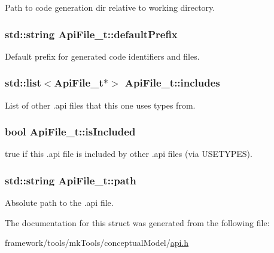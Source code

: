 Path to code generation dir relative to working directory. 

\subsubsection[{\texorpdfstring{default\+Prefix}{defaultPrefix}}]{\setlength{\rightskip}{0pt plus 5cm}std\+::string Api\+File\+\_\+t\+::default\+Prefix}\hypertarget{struct_api_file__t_a63d7e4e1d75ff7da2405b5e7bf440bc1}{}\label{struct_api_file__t_a63d7e4e1d75ff7da2405b5e7bf440bc1}


Default prefix for generated code identifiers and files. 

\subsubsection[{\texorpdfstring{includes}{includes}}]{\setlength{\rightskip}{0pt plus 5cm}std\+::list$<${\bf Api\+File\+\_\+t}$\ast$$>$ Api\+File\+\_\+t\+::includes}\hypertarget{struct_api_file__t_af7ec786baded7bc95d53ba85e99fd812}{}\label{struct_api_file__t_af7ec786baded7bc95d53ba85e99fd812}


List of other .api files that this one uses types from. 

\subsubsection[{\texorpdfstring{is\+Included}{isIncluded}}]{\setlength{\rightskip}{0pt plus 5cm}bool Api\+File\+\_\+t\+::is\+Included}\hypertarget{struct_api_file__t_a629534cf30c0a78fc4fa28b61850e402}{}\label{struct_api_file__t_a629534cf30c0a78fc4fa28b61850e402}


true if this .api file is included by other .api files (via U\+S\+E\+T\+Y\+P\+ES). 

\subsubsection[{\texorpdfstring{path}{path}}]{\setlength{\rightskip}{0pt plus 5cm}std\+::string Api\+File\+\_\+t\+::path}\hypertarget{struct_api_file__t_a1bae4c510119f193e9466cfe7e3c50d1}{}\label{struct_api_file__t_a1bae4c510119f193e9466cfe7e3c50d1}


Absolute path to the .api file. 



The documentation for this struct was generated from the following file\+:\begin{DoxyCompactItemize}
\item 
framework/tools/mk\+Tools/conceptual\+Model/\hyperlink{api_8h}{api.\+h}\end{DoxyCompactItemize}
